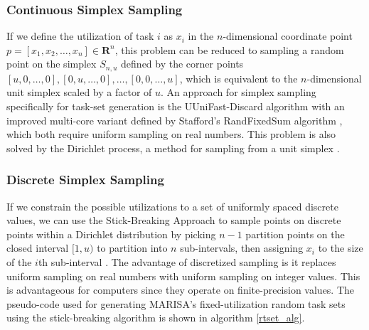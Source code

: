 \documentclass[conference,compsoc]{IEEEtran}
\begin{document}
\subsubsection{Continuous Simplex Sampling} If we define the utilization of task $i$ as $x_i$ in the $n$-dimensional coordinate point $p = [x_1, x_2, \ldots, x_n] \in \mathbf{R}^n$, this problem can be reduced to sampling a random point on the simplex $S_{n,u}$ defined by the corner points $[u,0,\ldots,0], [0,u,\ldots,0], \ldots, [0,0,\ldots,u]$, which is equivalent to the $n$-dimensional unit simplex scaled by a factor of $u$. An approach for simplex sampling specifically for task-set generation is the UUniFast-Discard algorithm \cite{uunifast} with an improved multi-core variant defined by Stafford's RandFixedSum algorithm \cite{randfixedsum}, which both require uniform sampling on real numbers. This problem is also solved by the Dirichlet process, a method for sampling from a unit simplex \cite{dirichlet}.

\subsubsection{Discrete Simplex Sampling} If we constrain the possible utilizations to a set of uniformly spaced discrete values, we can use the Stick-Breaking Approach to sample points on discrete points within a Dirichlet distribution by picking $n-1$ partition points on the closed interval $[1,u)$ to partition into $n$ sub-intervals, then assigning $x_i$ to the size of the $i$th sub-interval \cite{dirichlet}. The advantage of discretized sampling is it replaces uniform sampling on real numbers with uniform sampling on integer values. This is advantageous for computers since they operate on finite-precision values. The pseudo-code used for generating MARISA's fixed-utilization random task sets using the stick-breaking algorithm is shown in algorithm \ref{rtset_alg}.
\end{document}
